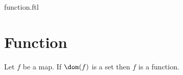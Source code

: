 \documentclass{naproche-library}
\begin{document}
\begin{smodule}{function.ftl}

  \section{Function}

  \begin{axiom}[forthel,title=Function Axiom,id=FOUNDATIONS_10_7781693549182976,printid]
    Let $f$ be a map.
    If $\dom(f)$ is a set then $f$ is a function.
  \end{axiom}
\end{smodule}
\end{document}
